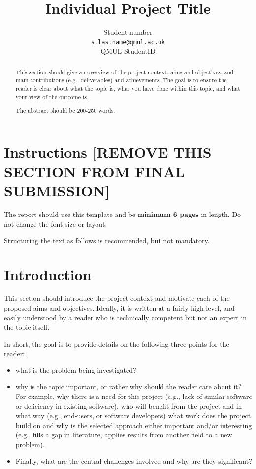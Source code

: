 \documentclass{article}
\title{Individual Project Title}
\author{
  Student number\\
  \texttt{s.lastname@qmul.ac.uk} \\
  QMUL StudentID\\
}
\begin{document}
\maketitle

\begin{abstract}
This section should give an overview of the project context, aims and objectives, and main contributions (e.g., deliverables) and achievements. The goal is to ensure the reader is clear about what the topic is, what you have done within this topic, and what your view of the outcome is. 

The abstract should be 200-250 words.
\end{abstract}

\section{Instructions [REMOVE THIS SECTION FROM FINAL SUBMISSION]}

The report should use this template and be \textbf{minimum 6 pages} in length. Do not change the font size or layout.

Structuring the text as follows is recommended, but not mandatory.

\section{Introduction}
This section should introduce the project context and motivate each of the proposed aims and objectives.  Ideally, it is written at a fairly high-level, and easily understood by a reader who is technically competent but not an expert in the topic itself.

In short, the goal is to provide details on the following three points for the reader:
\begin{itemize}
  \item what is the problem being investigated?  
  \item why is the topic important, or rather why should the reader care about it?  For example, why there is a need for this project (e.g., lack of similar software or deficiency in existing software), who will benefit from the project and in what way (e.g., end-users, or software developers) what work does the project build on and why is the selected approach either important and/or interesting (e.g., fills a gap in literature, applies results from another field to a new problem).  
  \item Finally, what are the central challenges involved and why are they significant? 
\end{itemize}
\end{document}
